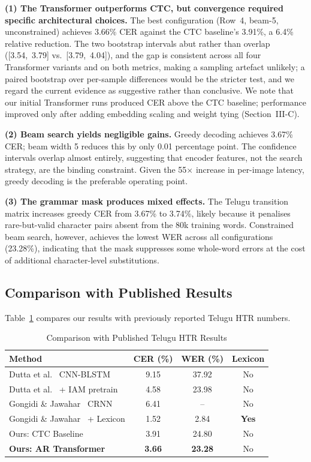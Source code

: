 \documentclass[conference]{IEEEtran}
\begin{document}
\noindent\textbf{(1) The Transformer outperforms CTC, but convergence required specific architectural choices.} The best configuration (Row~4, beam-5, unconstrained) achieves 3.66\% CER against the CTC baseline's 3.91\%, a 6.4\% relative reduction. The two bootstrap intervals abut rather than overlap ([3.54,~3.79] vs.~[3.79,~4.04]), and the gap is consistent across all four Transformer variants and on both metrics, making a sampling artefact unlikely; a paired bootstrap over per-sample differences would be the stricter test, and we regard the current evidence as suggestive rather than conclusive. We note that our initial Transformer runs produced CER above the CTC baseline; performance improved only after adding embedding scaling and weight tying (Section~III-C).

\noindent\textbf{(2) Beam search yields negligible gains.} Greedy decoding achieves 3.67\% CER; beam width 5 reduces this by only 0.01 percentage point. The confidence intervals overlap almost entirely, suggesting that encoder features, not the search strategy, are the binding constraint. Given the 55$\times$ increase in per-image latency, greedy decoding is the preferable operating point.

\noindent\textbf{(3) The grammar mask produces mixed effects.} The Telugu transition matrix increases greedy CER from 3.67\% to 3.74\%, likely because it penalises rare-but-valid character pairs absent from the 80k training words. Constrained beam search, however, achieves the lowest WER across all configurations (23.28\%), indicating that the mask suppresses some whole-word errors at the cost of additional character-level substitutions.

\subsection{Comparison with Published Results}

Table~\ref{tab:comparison} compares our results with previously reported Telugu HTR numbers.

\begin{table}[htbp]
\centering
\caption{Comparison with Published Telugu HTR Results}
\label{tab:comparison}
\begin{tabular}{lccc}
\toprule
\textbf{Method} & \textbf{CER (\%)} & \textbf{WER (\%)} & \textbf{Lexicon} \\
\midrule
Dutta et al.~\cite{dutta2018} CNN-BLSTM & 9.15 & 37.92 & No \\
Dutta et al.~\cite{dutta2018} + IAM pretrain & 4.58 & 23.98 & No \\
Gongidi \& Jawahar~\cite{gongidi2021iiit} CRNN & 6.41 & -- & No \\
Gongidi \& Jawahar~\cite{gongidi2021iiit} + Lexicon & 1.52 & 2.84 & \textbf{Yes} \\
\midrule
Ours: CTC Baseline & 3.91 & 24.80 & No \\
\textbf{Ours: AR Transformer} & \textbf{3.66} & \textbf{23.28} & No \\
\bottomrule
\end{tabular}
\end{table}
\end{document}

